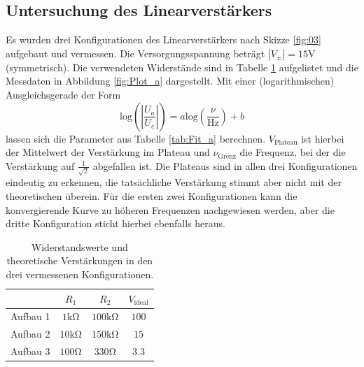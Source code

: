 
\subsection{Untersuchung des Linearverstärkers}
Es wurden drei Konfigurationen des Linearverstärkers nach Skizze \ref{fig:03} aufgebaut und vermessen. Die Versorgungsspannung beträgt $\left|V_{\pm}\right|=15\si{\volt}$ (symmetrisch). Die verwendeten Widerstände sind in Tabelle \ref{tab:Data_a} aufgelistet und die Messdaten in Abbildung \ref{fig:Plot_a} dargestellt. Mit einer (logarithmischen) Ausgleichsgerade der Form
\begin{equation}
  \text{log}\left(\left|\frac{U_a}{U_e}\right|\right) = a\text{log}\left(\frac{\nu}{\text{Hz}}\right) + b
  \label{eqn:log_fit}
\end{equation}
lassen sich die Parameter aus Tabelle \ref{tab:Fit_a} berechnen. $V_{\text{Plateau}}$ ist hierbei der Mittelwert der Verstärkung im Plateau und $\nu_{\text{Grenz}}$ die Frequenz, bei der die Verstärkung auf $\frac{1}{\sqrt{2}}$ abgefallen ist.
Die Plateaus sind in allen drei Konfigurationen eindeutig zu erkennen, die tatsächliche Verstärkung stimmt aber nicht mit der theoretischen überein. Für die ersten zwei Konfigurationen kann die konvergierende Kurve zu höheren Frequenzen nachgewiesen werden, aber die dritte Konfiguration sticht hierbei ebenfalls heraus.

\begin{table}
  \centering
  \caption{Widerstandswerte und theoretische Verstärkungen in den drei vermessenen Konfigurationen.}
  \label{tab:Data_a}
  \begin{tabular}{c|ccc}
    \toprule
              & $R_1$              & $R_2$               & $V_{\text{ideal}}$\\
    \midrule
    Aufbau 1  & $1\si{\kilo\ohm}$  & $100\si{\kilo\ohm}$ & $100$\\
    Aufbau 2  & $10\si{\kilo\ohm}$ & $150\si{\kilo\ohm}$ & $15$\\
    Aufbau 3  & $100\si{\ohm}$     & $330\si{\ohm}$      & $3.3$\\
    \bottomrule
  \end{tabular}
\end{table}

